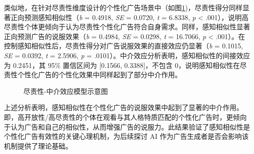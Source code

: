 类似地，在针对尽责性维度设计的个性化广告场景中（如图\ref{fig:conscientiousness-mediation_model})，尽责性得分同样显著正向预测感知相似性（\textit{b} = 0.4918, \textit{SE} = 0.0720, \textit{t} = 6.8338, \textit{p} < .001），说明高尽责性个体更倾向于认为尽责性个性化广告符合自身需求。同样，感知相似性显著正向预测广告的说服效果（\textit{b} = 0.4984, \textit{SE} = 0.0298, \textit{t} = 16.7066, \textit{p} < .001）。在控制感知相似性后，尽责性得分对广告说服效果的直接效应仍显著（\textit{b} = 0.1015, \textit{SE} = 0.0392, \textit{t} = 2.5906, \textit{p} = .0101）。中介效应分析表明，感知相似性的间接效应为 0.2451，其 95\% 置信区间为 [0.1566, 0.3388]，不包含 0，说明感知相似性在尽责性个性化广告的个性化效果中同样起到了部分中介作用。

\begin{figure}[H] %
    \centering
    \caption{尽责性-中介效应模型示意图}
    \label{fig:conscientiousness-mediation_model} %
\end{figure}


上述分析表明，感知相似性在个性化广告的说服效果中起到了显著的中介作用。即，高开放性/高尽责性的个体在观看与其人格特质匹配的个性化广告时，更倾向于认为广告和自己的相似性，从而增强广告的说服力。此结果验证了感知相似性是个性化广告有效性的关键心理机制，为后续探讨 AI 作为广告生成者是否会影响该机制提供了理论基础。

